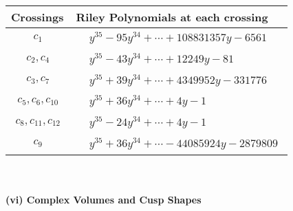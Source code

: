\documentclass[1p]{elsarticle_modified}
\theoremstyle{definition}
\begin{document}
\begin{tabular}{m{50pt}|m{274pt}}
Crossings & \hspace{64pt}Riley Polynomials at each crossing \\
\hline $$\begin{aligned}c_{1}\end{aligned}$$&$\begin{aligned}
&y^{35}-95 y^{34}+\cdots+108831357 y-6561
\end{aligned}$\\
\hline $$\begin{aligned}c_{2},c_{4}\end{aligned}$$&$\begin{aligned}
&y^{35}-43 y^{34}+\cdots+12249 y-81
\end{aligned}$\\
\hline $$\begin{aligned}c_{3},c_{7}\end{aligned}$$&$\begin{aligned}
&y^{35}+39 y^{34}+\cdots+4349952 y-331776
\end{aligned}$\\
\hline $$\begin{aligned}c_{5},c_{6},c_{10}\end{aligned}$$&$\begin{aligned}
&y^{35}+36 y^{34}+\cdots+4 y-1
\end{aligned}$\\
\hline $$\begin{aligned}c_{8},c_{11},c_{12}\end{aligned}$$&$\begin{aligned}
&y^{35}-24 y^{34}+\cdots+4 y-1
\end{aligned}$\\
\hline $$\begin{aligned}c_{9}\end{aligned}$$&$\begin{aligned}
&y^{35}+36 y^{34}+\cdots-44085924 y-2879809
\end{aligned}$\\
\hline
\end{tabular}\\~\\
\newpage\flushleft \textbf{(vi) Complex Volumes and Cusp Shapes}
\end{document}
